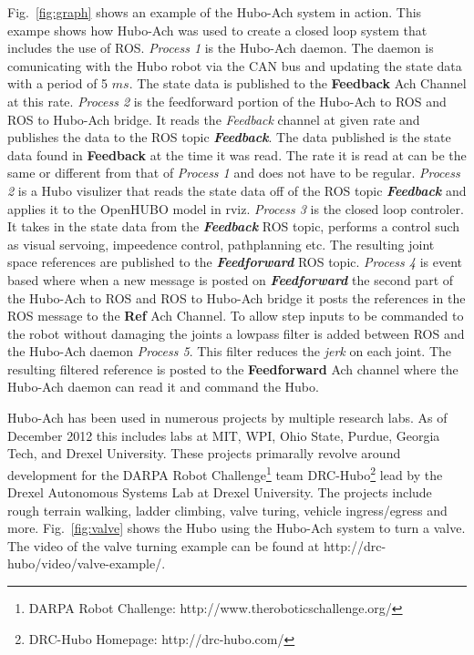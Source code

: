 Fig.~\ref{fig:graph} shows an example of the Hubo-Ach system in action.
This exampe shows how Hubo-Ach was used to create a closed loop system that includes the use of ROS.
\textit{Process 1} is the Hubo-Ach daemon.
The daemon is comunicating with the Hubo robot via the CAN bus and updating the state data with a period of 5 $ms$.
The state data is published to the \textbf{Feedback} Ach Channel at this rate.
\textit{Process 2} is the feedforward portion of the Hubo-Ach to ROS and ROS to Hubo-Ach bridge.
It reads the \textit{Feedback} channel at given rate and publishes the data to the ROS topic \textit{\textbf{Feedback}}.  
The data published is the state data found in \textbf{Feedback} at the time it was read.
The rate it is read at can be the same or different from that of \textit{Process 1} and does not have to be regular.
\textit{Process 2} is a Hubo visulizer that reads the state data off of the ROS topic \textit{\textbf{Feedback}} and applies it to the OpenHUBO model in rviz.
\textit{Process 3} is the closed loop controler.  
It takes in the state data from the \textit{\textbf{Feedback}} ROS topic, performs a control such as visual servoing, impeedence control, pathplanning etc.
The resulting joint space references are published to the \textit{\textbf{Feedforward}} ROS topic.
\textit{Process 4} is event based where when a new message is posted on \textit{\textbf{Feedforward}} the second part of the Hubo-Ach to ROS and ROS to Hubo-Ach bridge it posts the references in the ROS message to the \textbf{Ref} Ach Channel.
To allow step inputs to be commanded to the robot without damaging the joints a lowpass filter is added between ROS and the Hubo-Ach daemon \textit{Process 5}.  
This filter reduces the \textit{jerk} on each joint.
The resulting filtered reference is posted to the \textbf{Feedforward} Ach channel where the Hubo-Ach daemon can read it and command the Hubo.

Hubo-Ach has been used in numerous projects by multiple research labs.  
As of December 2012 this includes labs at MIT, WPI, Ohio State, Purdue, Georgia Tech, and Drexel University.
These projects primarally revolve around development for the DARPA Robot Challenge\footnote{DARPA Robot Challenge: http://www.theroboticschallenge.org/} team DRC-Hubo\footnote{DRC-Hubo Homepage: http://drc-hubo.com/} lead by the Drexel Autonomous Systems Lab at Drexel University.
The projects include rough terrain walking, ladder climbing, valve turing, vehicle ingress/egress and more.
Fig.~\ref{fig:valve} shows the Hubo using the Hubo-Ach system to turn a valve.
The video of the valve turning example can be found at http://drc-hubo/video/valve-example/. 

